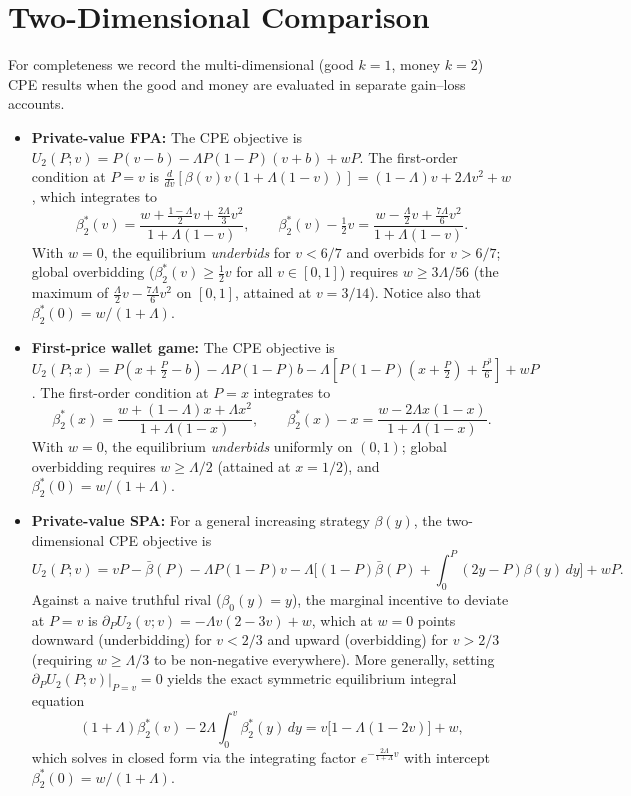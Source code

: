 \documentclass[11pt,a4paper]{article}
\theoremstyle{remark}
\begin{document}
\appendix
\section{Two-Dimensional Comparison}
\label{app:two}
For completeness we record the multi-dimensional (good $k=1$, money $k=2$) CPE
results when the good and money are evaluated in separate gain--loss accounts.

\begin{itemize}
\item \textbf{Private-value FPA:} The CPE objective is
$U_2(P;v)=P(v-b)-\Lambda P(1-P)(v+b)+wP$. The first-order condition at $P=v$ is
$\frac{d}{dv}[\beta(v)v(1+\Lambda(1-v))]=(1-\Lambda)v+2\Lambda v^2+w$, which
integrates to
\begin{equation}
\beta^{*}_{2}(v)=\frac{w+\tfrac{1-\Lambda}{2}v+\tfrac{2\Lambda}{3}v^{2}}{1+\Lambda(1-v)},
\qquad
\beta^{*}_{2}(v)-\tfrac12 v=\frac{w-\tfrac{\Lambda}{2}v+\tfrac{7\Lambda}{6}v^{2}}{1+\Lambda(1-v)} .
\end{equation}
With $w=0$, the equilibrium \emph{underbids} for $v<6/7$ and overbids for $v>6/7$;
global overbidding ($\beta^*_2(v)\ge \tfrac12 v$ for all $v\in[0,1]$) requires
$w\ge 3\Lambda/56$ (the maximum of $\tfrac{\Lambda}{2}v-\tfrac{7\Lambda}{6}v^2$ on
$[0,1]$, attained at $v=3/14$). Notice also that $\beta^*_2(0)=w/(1+\Lambda)$.

\item \textbf{First-price wallet game:} The CPE objective is
$U_2(P;x)=P(x+\tfrac{P}{2}-b)-\Lambda P(1-P)b-\Lambda[P(1-P)(x+\tfrac{P}{2})+\tfrac{P^3}{6}]+wP$.
The first-order condition at $P=x$ integrates to
\begin{equation}
\beta^{*}_{2}(x)=\frac{w+(1-\Lambda)x+\Lambda x^{2}}{1+\Lambda(1-x)},
\qquad
\beta^{*}_{2}(x)-x=\frac{w-2\Lambda x(1-x)}{1+\Lambda(1-x)} .
\end{equation}
With $w=0$, the equilibrium \emph{underbids} uniformly on $(0,1)$; global overbidding
requires $w\ge\Lambda/2$ (attained at $x=1/2$), and $\beta^*_2(0)=w/(1+\Lambda)$.

\item \textbf{Private-value SPA:} For a general increasing strategy $\beta(y)$, the
two-dimensional CPE objective is
\begin{equation}
U_2(P;v)=vP-\bar\beta(P)-\Lambda P(1-P)v
-\Lambda\Big[(1-P)\bar\beta(P)+\int_0^P(2y-P)\beta(y)\,dy\Big]+wP.
\end{equation}
Against a naive truthful rival ($\beta_0(y)=y$), the marginal incentive to deviate at
$P=v$ is $\partial_P U_2(v;v)=-\Lambda v(2-3v)+w$, which at $w=0$ points downward
(underbidding) for $v<2/3$ and upward (overbidding) for $v>2/3$ (requiring
$w\ge\Lambda/3$ to be non-negative everywhere). More generally, setting
$\partial_P U_2(P;v)|_{P=v}=0$ yields the exact symmetric equilibrium integral
equation
\begin{equation}
(1+\Lambda)\beta^*_2(v)-2\Lambda\int_0^v\beta^*_2(y)\,dy = v\big[1-\Lambda(1-2v)\big]+w,
\end{equation}
which solves in closed form via the integrating factor $e^{-\frac{2\Lambda}{1+\Lambda}v}$
with intercept $\beta^*_2(0)=w/(1+\Lambda)$.


\end{itemize}
\end{document}
